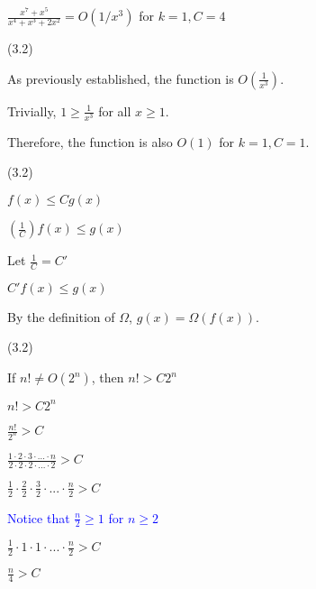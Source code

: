\documentclass{exam}
\begin{document}
\begin{questions}
\begin{subparts}
\begin{center}
\( \frac{x^7 + x^5}{x^4 + x^3 + 2x^2} = O(1/x^3)\) for \(k = 1, C = 4\)

\end{center}

\end{subparts}

 (3.2)

\begin{center}

As previously established, the function is \(O(\frac{1}{x^3})\).

Trivially, \(1 \geq \frac{1}{x^3}\) for all \(x \geq 1\).

Therefore, the function is also \(O(1)\) for \(k = 1, C = 1\).

\end{center}

\newpage

 (3.2)

\begin{center}

\( f(x) \leq Cg(x) \)

\( (\frac{1}{C})f(x) \leq g(x) \)

Let \(\frac{1}{C} = C'\)

\( C'f(x) \leq g(x) \)

By the definition of \(\Omega\), \(g(x) = \Omega(f(x))\).

\end{center}

 (3.2)

\begin{center}

If \(n! \neq O(2^n)\), then \(n! > C2^n\)

\( n! > C2^n \)

\( \frac{n!}{2^n} > C \)

\( \frac{1 \cdot 2 \cdot 3 \cdot ... \cdot n}{2 \cdot 2 \cdot 2 \cdot ... \cdot 2} > C\)

\( \frac{1}{2} \cdot \frac{2}{2} \cdot \frac{3}{2} \cdot ... \cdot \frac{n}{2} > C\)

\textcolor{blue}{Notice that \(\frac{n}{2} \geq 1\) for \(n \geq 2\)}

\( \frac{1}{2} \cdot 1 \cdot 1 \cdot ... \cdot \frac{n}{2} > C\)

\( \frac{n}{4} > C\)


\end{center}
\end{questions}
\end{document}

